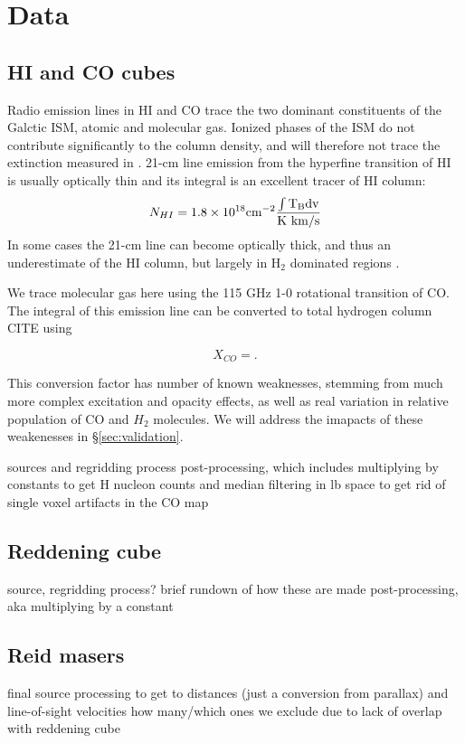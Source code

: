 \section{Data}
\label{sec:data}
\subsection{HI and CO cubes}

Radio emission lines in HI and CO trace the two dominant constituents of the Galctic ISM, atomic and molecular gas. Ionized phases of the ISM do not contribute significantly to the column density, and will therefore not trace the extinction measured in \cite{Green_2015}. 21-cm line emission from the hyperfine transition of HI is usually optically thin and its integral is an excellent tracer of HI column:
\begin{equation}
N_{HI} = 1.8 \times 10^{18} \rm cm^{-2} \frac{ \int T_B dv}{\rm K~km/s}
\end{equation}
In some cases the 21-cm line can become optically thick, and thus an underestimate of the HI column, but largely in H$_2$ dominated regions \cite{Goldsmith_2007}. 

We trace molecular gas here using the 115 GHz 1-0 rotational transition of CO. The integral of this emission line can be converted to total hydrogen column CITE using

\begin{equation}
X_{CO} = .
\end{equation}

This conversion factor has number of known weaknesses, stemming from much more complex excitation and opacity effects, as well as real variation in relative population of CO and $H_2$ molecules. We will address the imapacts of these weakenesses in \S \ref{sec:validation}. 


sources and regridding process
post-processing, which includes multiplying by constants to get H nucleon counts and median filtering in lb space to get rid of single voxel artifacts in the CO map

\subsection{Reddening cube}
source, regridding process?
brief rundown of how these are made
post-processing, aka multiplying by a constant

\subsection{Reid masers}
final source
processing to get to distances (just a conversion from parallax) and line-of-sight velocities
how many/which ones we exclude due to lack of overlap with reddening cube